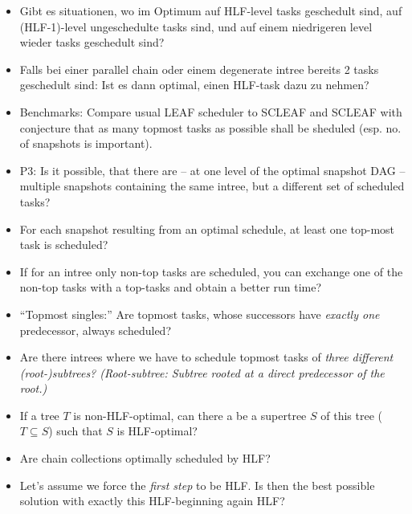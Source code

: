 \documentclass[a4paper, 10pt, oneside]{book}
\begin{document}
\begin{itemize}
\item Gibt es situationen, wo im Optimum auf HLF-level tasks geschedult sind, auf (HLF-1)-level ungeschedulte tasks sind, und auf einem niedrigeren level wieder tasks geschedult sind?
\item Falls bei einer parallel chain oder einem degenerate intree bereits 2 tasks geschedult sind: Ist es dann optimal, einen HLF-task dazu zu nehmen?
\item Benchmarks: Compare usual LEAF scheduler to SCLEAF and SCLEAF with conjecture that as many topmost tasks as possible shall be sheduled (esp. no. of snapshots is important).
\item P3: Is it possible, that there are -- at one level of the optimal snapshot DAG -- multiple snapshots containing the same intree, but a different set of scheduled tasks? 
\item For each snapshot resulting from an optimal schedule, at least one top-most task is scheduled? 
\item If for an intree only non-top tasks are scheduled, you can exchange one of the non-top tasks with a top-tasks and obtain a better run time?
\item ``Topmost singles:'' Are topmost tasks, whose successors have \emph{exactly one} predecessor, always scheduled?
\item Are there intrees where we have to schedule topmost tasks of \emph{three different (root-)subtrees? (Root-subtree: Subtree rooted at a direct predecessor of the root.)}
\item If a tree $T$ is non-HLF-optimal, can there a be a supertree $S$ of this tree ($T\subseteq S$) such that $S$ is HLF-optimal? 
\item Are chain collections optimally scheduled by HLF?
\item Let's assume we force the \emph{first step} to be HLF. Is then the best possible solution with exactly this HLF-beginning again HLF?
\end{itemize}
\end{document}
